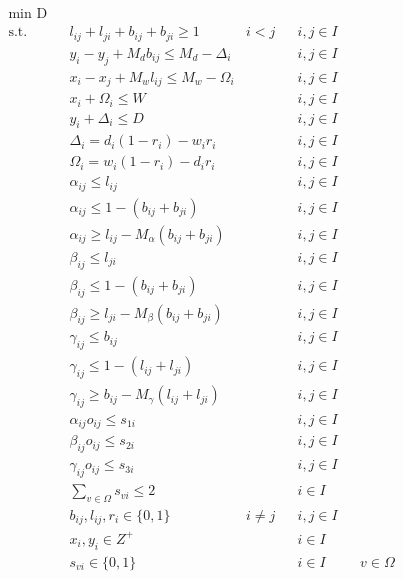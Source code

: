 \begin{align}
	& \underset{}{\text{min D}}\\
	& \text{s.t.} & &  l_{ij} + l_{ji} + b_{ij} + b_{ji} \geq 1 & i < j && i,j \in I \label{equa30}\\
	& & & y_i - y_j + M_d b_{ij} \leq M_d - \Delta_i & & & i,j \in I \label{equa31}\\
	& & & x_i - x_j + M_w l_{ij} \leq M_w - \Omega_i & & & i,j \in I \label{equa32}\\
	& & & x_i + \Omega_i \leq W & & & i,j \in I \label{equa34}\\
	& & & y_i + \Delta_i \leq D & & & i,j \in I \label{equa35}\\
	& & & \Delta_i = d_i (1 - r_i) - w_i r_i &      &   & i,j \in I \label{equa36}\\
	& & & \Omega_i = w_i (1 - r_i) - d_i r_i &          &   & i,j \in I \label{equa37}\\
	&   &   & \alpha_{ij} \leq l_{ij}                             &   &   & i,j \in I \label{equa38} \\
	&   &   & \alpha_{ij} \leq 1 - (b_{ij} + b_{ji})              &   &   & i,j \in I \label{equa39} \\
	&   &   & \alpha_{ij} \geq l_{ij} - M_\alpha(b_{ij} + b_{ji}) &   &   & i,j \in I \label{equa40} \\
	&   &   & \beta_{ij} \leq l_{ji}                              &   &   & i,j \in I \label{equa41} \\
	&   &   & \beta_{ij} \leq 1 - (b_{ij} + b_{ji})               &   &   & i,j \in I \label{equa42} \\
	&   &   & \beta_{ij} \geq l_{ji} - M_\beta(b_{ij} + b_{ji})   &   &   & i,j \in I \label{equa43} \\
	&   &   & \gamma_{ij} \leq b_{ij}                             &   &   & i,j \in I \label{equa44} \\
	&   &   & \gamma_{ij} \leq 1 - (l_{ij} + l_{ji})              &   &   & i,j \in I \label{equa45} \\
	&   &   & \gamma_{ij} \geq b_{ij} - M_\gamma(l_{ij} + l_{ji}) &   &   & i,j \in I \label{equa46} \\
	& & & \alpha_{ij}o_{ij} \leq s_{1i}  & & & i,j \in I \label{equa47}\\
	& & & \beta_{ij}o_{ij} \leq s_{2i}  & & & i,j \in I \label{equa48}\\
	& & & \gamma_{ij}o_{ij} \leq s_{3i}  & & & i,j \in I \label{equa49}\\
	  &   &   & \sum_{v \in \Omega} s_{vi} \leq 2 &   &   & i \in I &   & \label{equa50} \\
	& & & b_{ij}, l_{ij}, r_i \in \{0,1\} & i \neq j & & i,j \in I \\
	& & & x_{i}, y_{i} \in Z^{+} & & & i \in I \\
	  &   &   & s_{vi} \in \{0,1\}                &   &   & i \in I &   & v\in \Omega    \\
\end{align}

